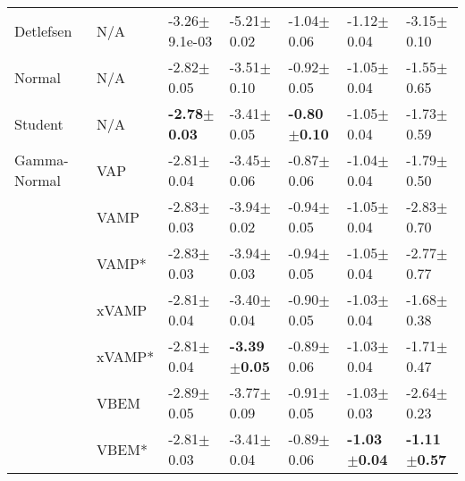 \begin{tabular}{lllllll}
\midrule
Detlefsen & N/A &        -3.26$\pm$9.1e-03 &           -5.21$\pm$0.02 &           -1.04$\pm$0.06 &           -1.12$\pm$0.04 &           -3.15$\pm$0.10 \\
Normal & N/A &           -2.82$\pm$0.05 &           -3.51$\pm$0.10 &           -0.92$\pm$0.05 &           -1.05$\pm$0.04 &           -1.55$\pm$0.65 \\
Student & N/A &  \textbf{-2.78$\pm$0.03} &           -3.41$\pm$0.05 &  \textbf{-0.80$\pm$0.10} &           -1.05$\pm$0.04 &           -1.73$\pm$0.59 \\
Gamma-Normal & VAP &           -2.81$\pm$0.04 &           -3.45$\pm$0.06 &           -0.87$\pm$0.06 &           -1.04$\pm$0.04 &           -1.79$\pm$0.50 \\
             & VAMP &           -2.83$\pm$0.03 &           -3.94$\pm$0.02 &           -0.94$\pm$0.05 &           -1.05$\pm$0.04 &           -2.83$\pm$0.70 \\
             & VAMP* &           -2.83$\pm$0.03 &           -3.94$\pm$0.03 &           -0.94$\pm$0.05 &           -1.05$\pm$0.04 &           -2.77$\pm$0.77 \\
             & xVAMP &           -2.81$\pm$0.04 &           -3.40$\pm$0.04 &           -0.90$\pm$0.05 &           -1.03$\pm$0.04 &           -1.68$\pm$0.38 \\
             & xVAMP* &           -2.81$\pm$0.04 &  \textbf{-3.39$\pm$0.05} &           -0.89$\pm$0.06 &           -1.03$\pm$0.04 &           -1.71$\pm$0.47 \\
             & VBEM &           -2.89$\pm$0.05 &           -3.77$\pm$0.09 &           -0.91$\pm$0.05 &           -1.03$\pm$0.03 &           -2.64$\pm$0.23 \\
             & VBEM* &           -2.81$\pm$0.03 &           -3.41$\pm$0.04 &           -0.89$\pm$0.06 &  \textbf{-1.03$\pm$0.04} &  \textbf{-1.11$\pm$0.57} \\
\bottomrule
\end{tabular}

